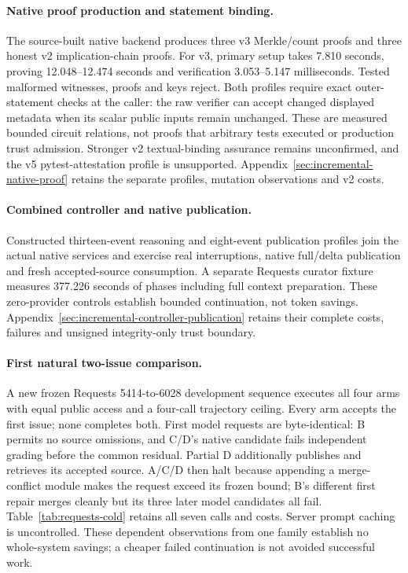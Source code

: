 \paragraph{Native proof production and statement binding.}
The source-built native backend produces three v3 Merkle/count proofs and three
honest v2 implication-chain proofs. For v3, primary setup takes 7.810
seconds, proving 12.048--12.474 seconds and verification
3.053--5.147 milliseconds. Tested malformed witnesses, proofs and
keys reject. Both profiles require exact outer-statement checks at the caller:
the raw verifier can accept changed displayed metadata when its scalar public
inputs remain unchanged. These are measured bounded circuit relations, not
proofs that arbitrary tests executed or production trust admission. Stronger
v2 textual-binding assurance remains unconfirmed, and the v5 pytest-attestation
profile is unsupported. Appendix~\ref{sec:incremental-native-proof} retains the
separate profiles, mutation observations and v2 costs.

\paragraph{Combined controller and native publication.}
Constructed thirteen-event reasoning and eight-event publication profiles join
the actual native services and exercise real interruptions, native full/delta
publication and fresh accepted-source consumption. A separate Requests curator
fixture measures 377.226 seconds of phases including full context
preparation. These zero-provider controls establish bounded continuation,
not token savings. Appendix~\ref{sec:incremental-controller-publication} retains
their complete costs, failures and unsigned integrity-only trust boundary.

\paragraph{First natural two-issue comparison.}
A new frozen Requests 5414-to-6028 development sequence executes all four
arms with equal public access and a four-call trajectory ceiling. Every arm
accepts the first issue; none completes both. First model requests are
byte-identical: B permits no source omissions, and C/D's native candidate
fails independent grading before the common residual. Partial D additionally
publishes and retrieves its accepted source. A/C/D then halt because appending
a merge-conflict module makes the request exceed its frozen bound; B's
different first repair merges cleanly but its three later model candidates
all fail. Table~\ref{tab:requests-cold} retains all seven calls and costs.
Server prompt caching is uncontrolled. These dependent observations from one
family establish no whole-system savings; a cheaper failed continuation is
not avoided successful work.


